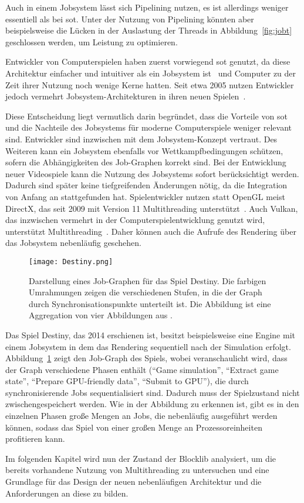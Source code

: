 Auch in einem Jobsystem lässt sich Pipelining nutzen, es ist allerdings weniger essentiell als bei \ac{sot}. Unter der Nutzung von Pipelining könnten aber beispielsweise die Lücken in der Auslastung der Threads in Abbildung~\ref{fig:jobt} geschlossen werden, um Leistung zu optimieren.

Entwickler von Computerspielen haben zuerst vorwiegend \ac{sot} genutzt, da diese Architektur einfacher und intuitiver als ein Jobsystem ist~\cite{Genova2015,Tatarchuk2014} und Computer zu der Zeit ihrer Nutzung noch wenige Kerne hatten. Seit etwa 2005 nutzen Entwickler jedoch vermehrt Jobsystem-Architekturen in ihren neuen Spielen~\cite{Davies2006,Tatarchuk2014,Genova2015,Gyrling2015,Hodgman2016}.

Diese Entscheidung liegt vermutlich darin begründet, dass die Vorteile von \ac{sot} und die Nachteile des Jobsystems für moderne Computerspiele weniger relevant sind. Entwickler sind inzwischen mit dem Jobsystem-Konzept vertraut. Des Weiteren kann ein Jobsystem ebenfalls vor Wettkampfbedingungen schützen, sofern die Abhängigkeiten des Job-Graphen korrekt sind. Bei der Entwicklung neuer Videospiele kann die Nutzung des Jobsystems sofort berücksichtigt werden. Dadurch sind später keine tiefgreifenden Änderungen nötig, da die Integration von Anfang an stattgefunden hat. Spielentwickler nutzen statt OpenGL meist DirectX, das seit 2009 mit Version 11 Multithreading unterstützt~\cite{White2018}. Auch Vulkan, das inzwischen vermehrt in der Computerspielentwicklung genutzt wird, unterstützt Multithreading~\cite{Schott2016}. Daher können auch die Aufrufe des Rendering über das Jobsystem nebenläufig geschehen.

\begin{figure}
	\centering
	\texttt{[image: Destiny.png]}
	 \caption[Darstellung eines Job-Graphen für das Spiel Destiny.]{Darstellung eines Job-Graphen für das Spiel Destiny. Die farbigen Umrahmungen zeigen die verschiedenen Stufen, in die der Graph durch Synchronisationspunkte unterteilt ist. Die Abbildung ist eine Aggregation von vier Abbildungen aus \cite[S.~39~ff.]{Tatarchuk2014}.}\label{fig:destiny-jobgraph}
\end{figure}

Das Spiel Destiny, das 2014 erschienen ist, besitzt beispielsweise eine Engine mit einem Jobsystem in dem das Rendering sequentiell nach der Simulation erfolgt. Abbildung~\ref{fig:destiny-jobgraph} zeigt den Job-Graph des Spiels, wobei veranschaulicht wird, dass der Graph verschiedene Phasen enthält (\enquote{Game simulation}, \enquote{Extract game state}, \enquote{Prepare GPU-friendly data}, \enquote{Submit to GPU}), die durch synchronisierende Jobs sequentialisiert sind. Dadurch muss der Spielzustand nicht zwischengespeichert werden. Wie in der Abbildung zu erkennen ist, gibt es in den einzelnen Phasen große Mengen an Jobs, die nebenläufig ausgeführt werden können, sodass das Spiel von einer großen Menge an Prozessoreinheiten profitieren kann.

Im folgenden Kapitel wird nun der Zustand der Blocklib analysiert, um die bereits vorhandene Nutzung von Multithreading zu untersuchen und eine Grundlage für das Design der neuen nebenläufigen Architektur und die Anforderungen an diese zu bilden.